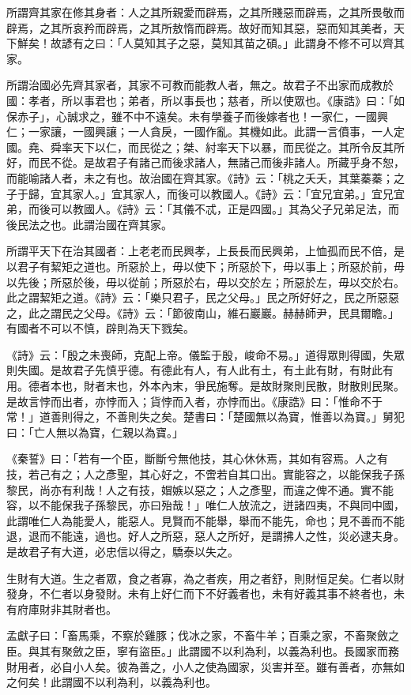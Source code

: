 \documentclass[12pt,a4paper]{ctexbook}
\begin{document}
所謂齊其家在修其身者：人之其所親愛而辟焉，之其所賤惡而辟焉，之其所畏敬而辟焉，之其所哀矜而辟焉，之其所敖惰而辟焉。故好而知其惡，惡而知其美者，天下鮮矣！故諺有之曰：「人莫知其子之惡，莫知其苗之碩。」此謂身不修不可以齊其家。\par
所謂治國必先齊其家者，其家不可教而能教人者，無之。故君子不出家而成教於國：孝者，所以事君也；弟者，所以事長也；慈者，所以使眾也。《康誥》曰：「如保赤子」，心誠求之，雖不中不遠矣。未有學養子而後嫁者也！一家仁，一國興仁；一家讓，一國興讓；一人貪戾，一國作亂。其機如此。此謂一言僨事，一人定國。堯、舜率天下以仁，而民從之；桀、紂率天下以暴，而民從之。其所令反其所好，而民不從。是故君子有諸己而後求諸人，無諸己而後非諸人。所藏乎身不恕，而能喻諸人者，未之有也。故治國在齊其家。《詩》云：「桃之夭夭，其葉蓁蓁；之子于歸，宜其家人。」宜其家人，而後可以教國人。《詩》云：「宜兄宜弟。」宜兄宜弟，而後可以教國人。《詩》云：「其儀不忒，正是四國。」其為父子兄弟足法，而後民法之也。此謂治國在齊其家。\par
所謂平天下在治其國者：上老老而民興孝，上長長而民興弟，上恤孤而民不倍，是以君子有絜矩之道也。所惡於上，毋以使下；所惡於下，毋以事上；所惡於前，毋以先後；所惡於後，毋以從前；所惡於右，毋以交於左；所惡於左，毋以交於右。此之謂絜矩之道。《詩》云：「樂只君子，民之父母。」民之所好好之，民之所惡惡之，此之謂民之父母。《詩》云：「節彼南山，維石巖巖。赫赫師尹，民具爾瞻。」有國者不可以不慎，辟則為天下戮矣。\par
《詩》云：「殷之未喪師，克配上帝。儀監于殷，峻命不易。」道得眾則得國，失眾則失國。是故君子先慎乎德。有德此有人，有人此有土，有土此有財，有財此有用。德者本也，財者末也，外本內末，爭民施奪。是故財聚則民散，財散則民聚。是故言悖而出者，亦悖而入；貨悖而入者，亦悖而出。《康誥》曰：「惟命不于常！」道善則得之，不善則失之矣。楚書曰：「楚國無以為寶，惟善以為寶。」舅犯曰：「亡人無以為寶，仁親以為寶。」\par
《秦誓》曰：「若有一个臣，斷斷兮無他技，其心休休焉，其如有容焉。人之有技，若己有之；人之彥聖，其心好之，不啻若自其口出。實能容之，以能保我子孫黎民，尚亦有利哉！人之有技，媢嫉以惡之；人之彥聖，而違之俾不通。實不能容，以不能保我子孫黎民，亦曰殆哉！」唯仁人放流之，迸諸四夷，不與同中國，此謂唯仁人為能愛人，能惡人。見賢而不能舉，舉而不能先，命也；見不善而不能退，退而不能遠，過也。好人之所惡，惡人之所好，是謂拂人之性，災必逮夫身。是故君子有大道，必忠信以得之，驕泰以失之。\par
生財有大道。生之者眾，食之者寡，為之者疾，用之者舒，則財恒足矣。仁者以財發身，不仁者以身發財。未有上好仁而下不好義者也，未有好義其事不終者也，未有府庫財非其財者也。\par
孟獻子曰：「畜馬乘，不察於雞豚；伐冰之家，不畜牛羊；百乘之家，不畜聚斂之臣。與其有聚斂之臣，寧有盜臣。」此謂國不以利為利，以義為利也。長國家而務財用者，必自小人矣。彼為善之，小人之使為國家，災害并至。雖有善者，亦無如之何矣！此謂國不以利為利，以義為利也。\par
\end{document}
